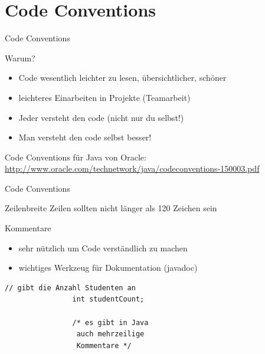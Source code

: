 \documentclass[18pt]{beamer}
\begin{document}
\section{Code Conventions}
\begin{frame}{Code Conventions}
        \begin{block}{Warum?}
                \begin{itemize}
                        \item Code wesentlich leichter zu lesen, übersichtlicher, schöner
                        \item leichteres Einarbeiten in Projekte (Teamarbeit)
                        \item Jeder versteht den code (nicht nur du selbst!)
                        \item Man versteht den code selbst besser!
                \end{itemize}
        \end{block}
        Code Conventions für Java von Oracle:\\
        \url{http://www.oracle.com/technetwork/java/codeconventions-150003.pdf}
\end{frame}

\begin{frame}[fragile]{Code Conventions}
        \begin{block}{Zeilenbreite}
                Zeilen sollten nicht länger als 120 Zeichen sein
        \end{block}
        \begin{block}{Kommentare}
                \begin{itemize}
                        \item sehr nützlich um Code verständlich zu machen
                        \item wichtiges Werkzeug für Dokumentation (javadoc)
                \end{itemize}
                \begin{lstlisting}[basicstyle=\scriptsize]
                // gibt die Anzahl Studenten an
                int studentCount;
                
                /* es gibt in Java
                 auch mehrzeilige
                 Kommentare */
                \end{lstlisting}
        \end{block}
\end{frame}
\end{document}

